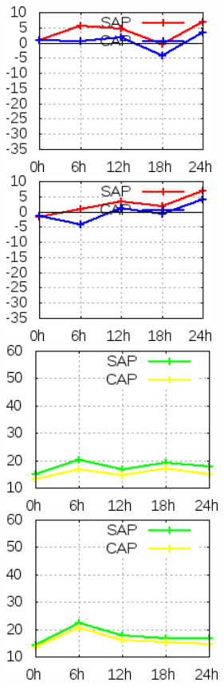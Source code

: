 \begin{figure}[!hbp]
\includegraphics[height=5.5cm]{./figs/VIES850zgeo0Z.png}\includegraphics[height=5.5cm]{./figs/VIES850zgeo12Z.png}
\includegraphics[height=5.5cm]{./figs/EQM850zgeo0Z.png}\includegraphics[height=5.5cm]{./figs/EQM850zgeo12Z.png}

\end{figure}
